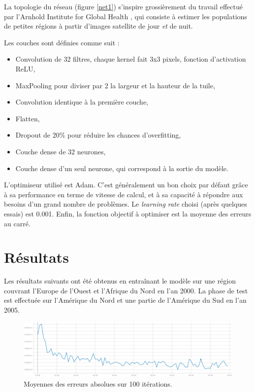\documentclass[a4paper, 11pt]{report}
\begin{document}
La topologie du réseau (figure \ref{net1}) s'inspire grossièrement du travail effectué par l'Arnhold Institute for Global Health \cite{netpop-article}, qui consiste à estimer les populations de petites régions à partir d'images satellite de jour \textit{et} de nuit.

Les couches sont définies comme suit :
\begin{itemize}
	\item Convolution de 32 filtres, chaque kernel fait 3x3 pixels, fonction d'activation ReLU,
	\item MaxPooling pour diviser par 2 la largeur et la hauteur de la tuile,
	\item Convolution identique à la première couche,
	\item Flatten,
	\item Dropout de 20\% pour réduire les chances d'overfitting,
	\item Couche dense de 32 neurones,
	\item Couche dense d'un seul neurone, qui correspond à la sortie du modèle.
\end{itemize}

L'optimiseur utilisé est Adam. C'est généralement un bon choix par défaut grâce à sa performance en terme de vitesse de calcul, et à sa capacité à répondre aux besoins d'un grand nombre de problèmes. Le \textit{learning rate} choisi (après quelques essais) est 0.001. Enfin, la fonction objectif à optimiser est la moyenne des erreurs au carré.

\section{Résultats}

Les résultats suivants ont été obtenus en entraînant le modèle sur une région couvrant l'Europe de l'Ouest et l'Afrique du Nord en l'an 2000. La phase de test est effectuée sur l'Amérique du Nord et une partie de l'Amérique du Sud en l'an 2005.

\begin{figure}
	\centering
	\includegraphics[width=1.0\textwidth]{img/mae1.png}
	\caption{Moyennes des erreurs absolues sur 100 itérations.}
	\label{mae1}
\end{figure}
\end{document}
